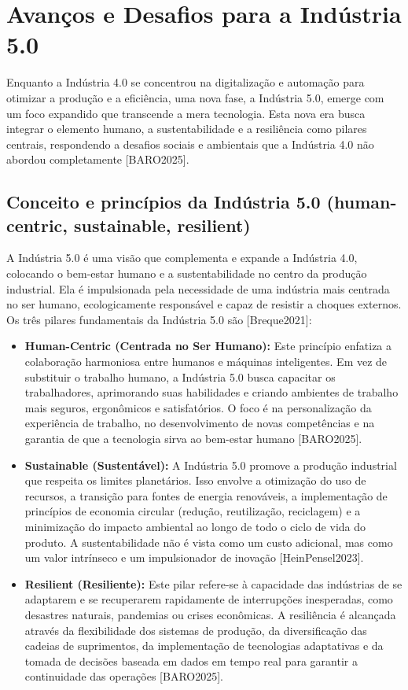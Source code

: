 \section{Avanços e Desafios para a Indústria 5.0}

Enquanto a Indústria 4.0 se concentrou na digitalização e automação para otimizar a produção e a eficiência, uma nova fase, a Indústria 5.0, emerge com um foco expandido que transcende a mera tecnologia. Esta nova era busca integrar o elemento humano, a sustentabilidade e a resiliência como pilares centrais, respondendo a desafios sociais e ambientais que a Indústria 4.0 não abordou completamente [BARO2025].

\subsection{Conceito e princípios da Indústria 5.0 (human-centric, sustainable, resilient)}

A Indústria 5.0 é uma visão que complementa e expande a Indústria 4.0, colocando o bem-estar humano e a sustentabilidade no centro da produção industrial. Ela é impulsionada pela necessidade de uma indústria mais centrada no ser humano, ecologicamente responsável e capaz de resistir a choques externos. Os três pilares fundamentais da Indústria 5.0 são [Breque2021]:

\begin{itemize}
    \item \textbf{Human-Centric (Centrada no Ser Humano):} Este princípio enfatiza a colaboração harmoniosa entre humanos e máquinas inteligentes. Em vez de substituir o trabalho humano, a Indústria 5.0 busca capacitar os trabalhadores, aprimorando suas habilidades e criando ambientes de trabalho mais seguros, ergonômicos e satisfatórios. O foco é na personalização da experiência de trabalho, no desenvolvimento de novas competências e na garantia de que a tecnologia sirva ao bem-estar humano [BARO2025].
    \item \textbf{Sustainable (Sustentável):} A Indústria 5.0 promove a produção industrial que respeita os limites planetários. Isso envolve a otimização do uso de recursos, a transição para fontes de energia renováveis, a implementação de princípios de economia circular (redução, reutilização, reciclagem) e a minimização do impacto ambiental ao longo de todo o ciclo de vida do produto. A sustentabilidade não é vista como um custo adicional, mas como um valor intrínseco e um impulsionador de inovação [HeinPensel2023].
    \item \textbf{Resilient (Resiliente):} Este pilar refere-se à capacidade das indústrias de se adaptarem e se recuperarem rapidamente de interrupções inesperadas, como desastres naturais, pandemias ou crises econômicas. A resiliência é alcançada através da flexibilidade dos sistemas de produção, da diversificação das cadeias de suprimentos, da implementação de tecnologias adaptativas e da tomada de decisões baseada em dados em tempo real para garantir a continuidade das operações [BARO2025].
\end{itemize}


